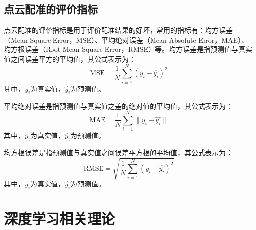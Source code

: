 \subsection{点云配准的评价指标}
点云配准的评价指标是用于评价配准结果的好坏，常用的指标有：均方误差（Mean Square Error，MSE）、平均绝对误差（Mean Absolute Error，MAE）、均方根误差（Root Mean Square Error，RMSE）等。均方误差是指预测值与真实值之间误差平方的平均值，其公式表示为：
\begin{equation}
	\text{MSE} = \frac{1}{N}\sum_{i=1}^{N}(y_i - \hat{y_i})^2
	\label{MSE}
\end{equation}
其中，$y_i$为真实值，$\hat{y_i}$为预测值。

平均绝对误差是指预测值与真实值之差的绝对值的平均值，其公式表示为：
\begin{equation}
	\text{MAE} = \frac{1}{N}\sum_{i=1}^{N}\|y_i - \hat{y_i} \|
	\label{MAE}
\end{equation}
其中，$y_i$为真实值，$\hat{y_i}$为预测值。

均方根误差是指预测值与真实值之间误差平方根的平均值，其公式表示为：
\begin{equation}
	\text{RMSE} = \sqrt{\frac{1}{N}\sum_{i=1}^{N}(y_i - \hat{y_i})^2}
	\label{RMSE}
\end{equation}
其中，$y_i$为真实值，$\hat{y_i}$为预测值。

\section{深度学习相关理论}

